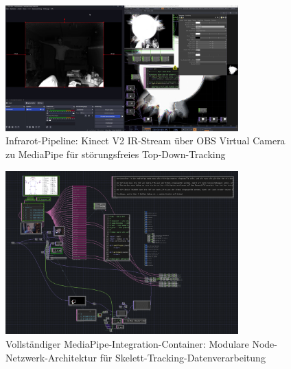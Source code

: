 \begin{figure}[htbp]
    \centering
    \includegraphics[width=0.8\textwidth,height=0.4\textheight,keepaspectratio]{images/InfraRedOBSCameraToMediaPipeForTopDownCirlceGradeMapping.png}
    \caption{Infrarot-Pipeline: Kinect V2 IR-Stream über OBS Virtual Camera zu MediaPipe für störungsfreies Top-Down-Tracking}
    \label{fig:infrarot_topdown_mapping}
\end{figure}

\begin{figure}[htbp]
    \centering
    \includegraphics[width=0.8\textwidth,height=0.4\textheight,keepaspectratio]{images/docupictures/Finished_MediaPipeContainer.png}
    \caption{Vollständiger MediaPipe-Integration-Container: Modulare Node-Netzwerk-Architektur für Skelett-Tracking-Datenverarbeitung}
    \label{fig:mediapipe_container_komplett}
\end{figure}




